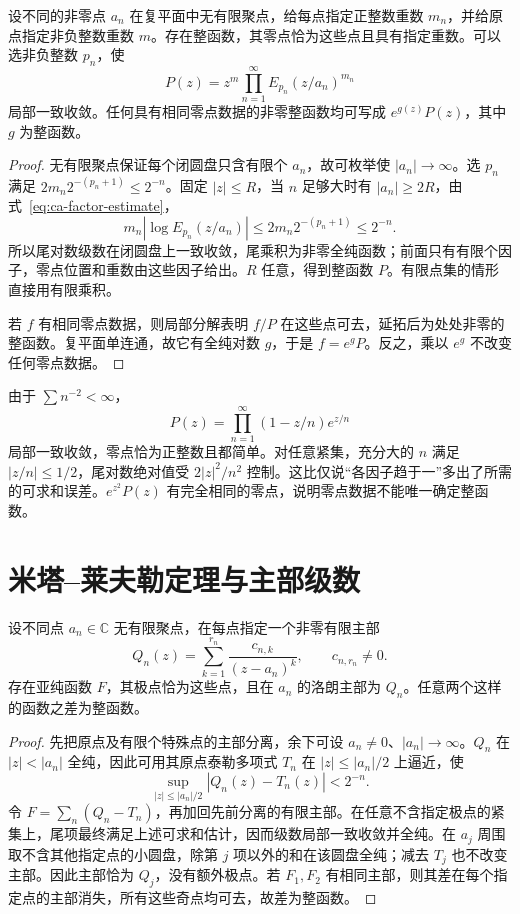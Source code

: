 \begin{theorem}
\label{thm:ca-weierstrass-product}
设不同的非零点 $a_n$ 在复平面中无有限聚点，给每点指定正整数重数 $m_n$，并给原点指定非负整数重数 $m$。存在整函数，其零点恰为这些点且具有指定重数。可以选非负整数 $p_n$，使
\begin{equation}
 P(z)=z^m\prod_{n=1}^{\infty}E_{p_n}(z/a_n)^{m_n}
 \label{eq:ca-canonical-product}
\end{equation}
局部一致收敛。任何具有相同零点数据的非零整函数均可写成 $e^{g(z)}P(z)$，其中 $g$ 为整函数。
\end{theorem}
\begin{proof}
无有限聚点保证每个闭圆盘只含有限个 $a_n$，故可枚举使 $|a_n|\to\infty$。选 $p_n$ 满足 $2m_n2^{-(p_n+1)}\le2^{-n}$。固定 $|z|\le R$，当 $n$ 足够大时有 $|a_n|\ge2R$，由式~\eqref{eq:ca-factor-estimate}，
\[
 m_n|\log E_{p_n}(z/a_n)|\le2m_n2^{-(p_n+1)}\le2^{-n}.
\]
所以尾对数级数在闭圆盘上一致收敛，尾乘积为非零全纯函数；前面只有有限个因子，零点位置和重数由这些因子给出。$R$ 任意，得到整函数 $P$。有限点集的情形直接用有限乘积。

若 $f$ 有相同零点数据，则局部分解表明 $f/P$ 在这些点可去，延拓后为处处非零的整函数。复平面单连通，故它有全纯对数 $g$，于是 $f=e^gP$。反之，乘以 $e^g$ 不改变任何零点数据。
\end{proof}

\begin{example}[给正整数指定简单零点]
由于 $\sum n^{-2}<\infty$，
\[
 P(z)=\prod_{n=1}^{\infty}(1-z/n)e^{z/n}
\]
局部一致收敛，零点恰为正整数且都简单。对任意紧集，充分大的 $n$ 满足 $|z/n|\le1/2$，尾对数绝对值受 $2|z|^2/n^2$ 控制。这比仅说“各因子趋于一”多出了所需的可求和误差。$e^{z^2}P(z)$ 有完全相同的零点，说明零点数据不能唯一确定整函数。
\end{example}

\section{米塔--莱夫勒定理与主部级数}

\begin{theorem}
\label{thm:ca-mittag-leffler}
设不同点 $a_n\in\mathbb C$ 无有限聚点，在每点指定一个非零有限主部
\[
 Q_n(z)=\sum_{k=1}^{r_n}\frac{c_{n,k}}{(z-a_n)^k},\qquad c_{n,r_n}\ne0.
\]
存在亚纯函数 $F$，其极点恰为这些点，且在 $a_n$ 的洛朗主部为 $Q_n$。任意两个这样的函数之差为整函数。
\end{theorem}
\begin{proof}
先把原点及有限个特殊点的主部分离，余下可设 $a_n\ne0$、$|a_n|\to\infty$。$Q_n$ 在 $|z|<|a_n|$ 全纯，因此可用其原点泰勒多项式 $T_n$ 在 $|z|\le|a_n|/2$ 上逼近，使
\[
 \sup_{|z|\le|a_n|/2}|Q_n(z)-T_n(z)|<2^{-n}.
\]
令 $F=\sum_n(Q_n-T_n)$，再加回先前分离的有限主部。在任意不含指定极点的紧集上，尾项最终满足上述可求和估计，因而级数局部一致收敛并全纯。在 $a_j$ 周围取不含其他指定点的小圆盘，除第 $j$ 项以外的和在该圆盘全纯；减去 $T_j$ 也不改变主部。因此主部恰为 $Q_j$，没有额外极点。若 $F_1,F_2$ 有相同主部，则其差在每个指定点的主部消失，所有这些奇点均可去，故差为整函数。
\end{proof}


